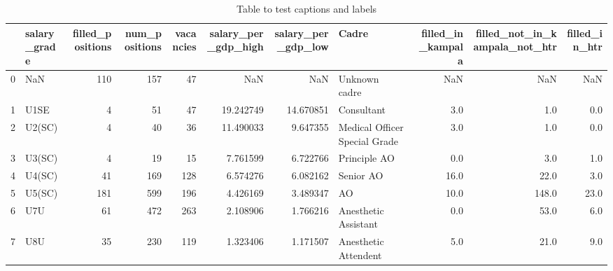 \documentclass[a4paper,11pt,final]{article}
\begin{document}
\pagebreak
\begin{landscape}
\begin{table}[h!]
\centering
\resizebox{25cm}{!} {


\begin{tabular}{llrrrrrlrrr}
\toprule
{} & salary\_grade &  filled\_positions &  num\_positions &  vacancies &  salary\_per\_gdp\_high &  salary\_per\_gdp\_low &                          Cadre &  filled\_in\_kampala &  filled\_not\_in\_kampala\_not\_htr &  filled\_in\_htr \\
\midrule
0 &          NaN &               110 &            157 &         47 &                  NaN &                 NaN &                  Unknown cadre &                NaN &                            NaN &            NaN \\
1 &         U1SE &                 4 &             51 &         47 &            19.242749 &           14.670851 &                     Consultant &                3.0 &                            1.0 &            0.0 \\
2 &       U2(SC) &                 4 &             40 &         36 &            11.490033 &            9.647355 &  Medical Officer Special Grade &                3.0 &                            1.0 &            0.0 \\
3 &       U3(SC) &                 4 &             19 &         15 &             7.761599 &            6.722766 &                   Principle AO &                0.0 &                            3.0 &            1.0 \\
4 &       U4(SC) &                41 &            169 &        128 &             6.574276 &            6.082162 &                      Senior AO &               16.0 &                           22.0 &            3.0 \\
5 &       U5(SC) &               181 &            599 &        196 &             4.426169 &            3.489347 &                             AO &               10.0 &                          148.0 &           23.0 \\
6 &          U7U &                61 &            472 &        263 &             2.108906 &            1.766216 &           Anesthetic Assistant &                0.0 &                           53.0 &            6.0 \\
7 &          U8U &                35 &            230 &        119 &             1.323406 &            1.171507 &           Anesthetic Attendent &                5.0 &                           21.0 &            9.0 \\
\bottomrule
\end{tabular}


}
\caption{Table to test captions and labels}

\label{table:1}
\end{table}
\end{landscape}
\pagebreak
\end{document}
